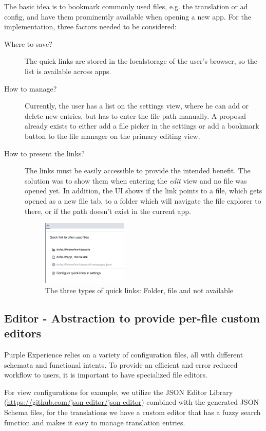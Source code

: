 The basic idea is to bookmark commonly used files, e.g. the translation or ad config, and have them prominently available when opening a new app.
For the implementation, three factors needed to be considered:
\begin{description}
  \item[Where to save?] The quick links are stored in the \Gls{localstorage} of the user's browser, so the list is available across apps.
  \item[How to manage?] Currently, the user has a list on the settings view, where he can add or delete new entries, but has to enter the file path manually.
  A proposal already exists to either add a file picker in the settings or add a bookmark button to the file manager on the primary editing view.
  \item[How to present the links?] The links must be easily accessible to provide the intended benefit. The solution was to show them when entering the \textit{edit} view and no file was opened yet.
  In addition, the UI shows if the link points to a file, which gets opened as a new file tab, to a folder which will navigate the file explorer to there, or if the path doesn't exist in the current app.
  \begin{figure}[h!]
    \centering
    \includegraphics[width=0.4\textwidth]{pics/quick_links.png}
    \caption{The three types of quick links: Folder, file and not available}
  \end{figure}
\end{description}

\subsection{Editor - Abstraction to provide per-file custom editors}

Purple Experience relies on a variety of configuration files, all with different schemata and functional intents.
To provide an efficient and error reduced workflow to users, it is important to have specialized file editors.

For view configurations for example, we utilize the JSON Editor Library (\url{https://github.com/json-editor/json-editor}) combined with the generated JSON Schema files,
for the translations we have a custom editor that has a fuzzy search function and makes it easy to manage translation entries.

